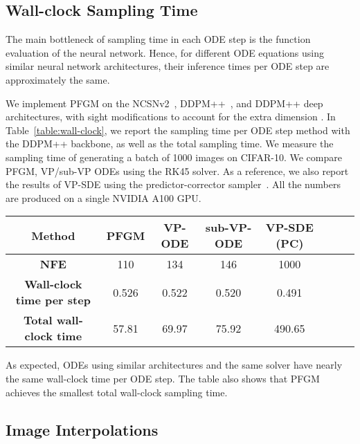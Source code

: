 \subsection{{Wall-clock Sampling Time}}

The main bottleneck of sampling time in each ODE step is the function evaluation of the neural network. Hence, for different ODE equations using similar neural network architectures, their inference times per ODE step are approximately the same.

We implement PFGM on the NCSNv2~\cite{Song2020ImprovedTF}, DDPM++~\cite{Song2021ScoreBasedGM}, and DDPM++ deep~\cite{Song2021ScoreBasedGM} architectures, with sight modifications to account for the extra dimension . In Table~\ref{table:wall-clock}, we report the sampling time per ODE step method with the DDPM++ backbone, as well as the total sampling time. We measure the sampling time of generating a batch of 1000 images on CIFAR-10. We compare PFGM, VP/sub-VP ODEs using the RK45 solver. As a reference, we also report the results of VP-SDE using the predictor-corrector sampler~\cite{Song2021ScoreBasedGM}. All the numbers are produced on a single NVIDIA A100 GPU.

\begin{table*}[htb]
\begin{center}
\caption{Wall-clock sampling time~(second)}
\label{table:wall-clock}
\begin{tabular}{c c c c c c c c}
		\toprule
		\textbf{Method} &  PFGM &VP-ODE& sub-VP-ODE& VP-SDE (PC)\\
		\midrule
        \textbf{NFE} & 110 & 134 &146 & 1000\\
		\midrule
        \textbf{Wall-clock time per step} & 0.526 & 0.522 &0.520 & 0.491\\
		\midrule
        \textbf{Total wall-clock time} & 57.81 & 69.97 &75.92&490.65\\
        \bottomrule
\end{tabular}
\end{center}
\end{table*}

As expected, ODEs using similar architectures and the same solver have nearly the same wall-clock time per ODE step. The table also shows that PFGM achieves the smallest total wall-clock sampling time. 

\subsection{Image Interpolations}
\label{app:interpolate}

